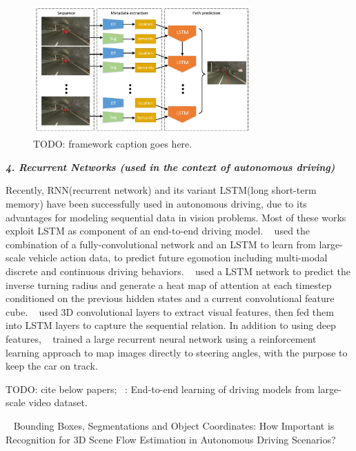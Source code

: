 \documentclass[10pt,twocolumn,letterpaper]{article}
\begin{document}
\begin{figure}[t]
        \centering
        \includegraphics[width=0.75\textwidth]{figures/framework.pdf}
        \caption{ {\small TODO: framework caption goes here.}}
        \label{fig:framework}
\end{figure}

\textbf{\emph{4. Recurrent Networks (used in the context of autonomous driving)}}


Recently, RNN(recurrent network) and its variant LSTM(long short-term memory) have been successfully used in autonomous driving, due to its advantages for modeling sequential data in vision problems. Most of these works exploit LSTM as component of an end-to-end driving model. ~\cite{xu2017end} used the combination of a fully-convolutional network and an LSTM to learn from large-scale vehicle action data, to predict future egomotion including multi-modal discrete and continuous driving behaviors. ~\cite{kim2017interpretable} used a LSTM network to predict the inverse turning radius and generate a heat map of attention at each timestep conditioned on the previous hidden states and a current convolutional feature cube. ~\cite{duself} used 3D convolutional layers to extract visual features, then fed them into LSTM layers to capture the sequential relation. In addition to using deep features, ~\cite{koutnik2013evolving} trained a large recurrent neural network using a reinforcement learning approach to map images directly to steering angles, with the purpose to keep the car on track.

TODO: cite below papers;
~\cite{xu2017end}: End-to-end learning of driving models from large-scale video dataset.

~\cite{behl2017bounding} Bounding Boxes, Segmentations and Object Coordinates: How Important is Recognition for 3D Scene Flow Estimation in Autonomous Driving Scenarios?
\end{document}

